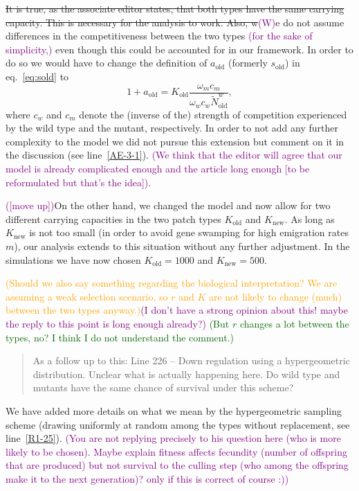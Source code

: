 \documentclass[11pt]{article}
\newenvironment{referee}{\vspace{0.cm} \sffamily \color{colreferee} \begin{quotation} }{\end{quotation} \vspace{0.cm}}
\newcommand{\lmarginpar}[1]{\reversemarginpar\marginpar{\textcolor{colreferee}{\textbf{\textsf{[#1]}}}}}
\newcommand{\addnb}[1]{\refstepcounter{numcom}\lmarginpar{\arabic{numcom}}\label{#1}}
\newcommand{\florence}[1]{\textcolor{purple}{(#1)}}
\newcommand{\hildegard}[1]{\textcolor{darkgreen}{(#1)}}
\newcommand{\pete}[1]{\textcolor{orange}{(#1)}}
\newcounter{numcom}
\begin{document}
\st{It is true, as the associate editor states, that both types have the same carrying capacity. This is necessary for the analysis to work. Also, w}\florence{W}e do not assume differences in the competitiveness between the two types \florence{for the sake of simplicity,} even though this could be accounted for in our framework. In order to do so we would have to change the definition of $a_{\text{old}}$ (formerly $s_{\text{old}}$) in eq.~\eqref{eq:sold} to 
\begin{equation}
    1 + a_{\text{old}} = K_{\text{old}} \frac{\omega_m c_m}{\omega_w c_w \widetilde{N}_{\text{old}}^w}, 
\end{equation}
where $c_w$ and $c_m$ denote the (inverse of the) strength of competition experienced by the wild type and the mutant, respectively. In order to not add any further complexity to the model we did not pursue this extension but comment on it in the discussion (see line~\ref{AE-3-1}). \florence{We think that the editor will agree that our model is already complicated enough and the article long enough [to be reformulated but that's the idea]}.

\florence{[move up]}On the other hand, we changed the model and now allow for two different carrying capacities in the two patch types $K_{\text{old}}$ and $K_{\text{new}}$. As long as $K_{\text{new}}$ is not too small (in order to avoid gene swamping for high emigration rates $m$), our analysis extends to this situation without any further adjustment. In the simulations we have now chosen $K_{\text{old}}=1000$ and $K_{\text{new}}=500$. 

\pete{Should we also say something regarding the biological interpretation? We are assuming a weak selection scenario, so $r$ and $K$ are not likely to change (much) between the two types anyway.}\florence{I don't have a strong opinion about this! maybe the reply to this point is long enough already?}
\hildegard{But $r$ changes a lot between the types, no? I think I do not understand the comment.}

\begin{referee}
As \addnb{AE3-b}a follow up to this: Line 226 – Down regulation using a hypergeometric distribution.   Unclear what is actually happening here.   Do wild type and mutants have the same chance of survival under this scheme?
\end{referee}
%
We have added more details on what we mean by the hypergeometric sampling scheme (drawing uniformly at random among the types without replacement, see line~\ref{R1-25}). \florence{You are not replying precisely to his question here (who is more likely to be chosen). Maybe explain fitness affects fecundity (number of offspring that are produced) but not survival to the culling step (who among the offspring make it to the next generation)? only if this is correct of course :)}
\end{document}
